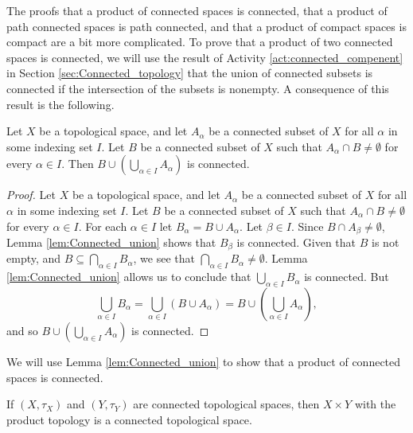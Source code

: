 The proofs that a product of connected spaces is connected, that a product of path connected spaces is path connected, and that a product of compact spaces is compact are a bit more complicated. To prove that a product of two connected spaces is connected, we will use the result of Activity \ref{act:connected_compenent} in Section \ref{sec:Connected_topology} that the union of connected subsets is connected if the intersection of the subsets is nonempty. A consequence of this result is the following.
\label{cor:Connected_union}
\begin{lemma} \label{lem:Connected_union} Let $X$ be a topological space, and let $A_{\alpha}$ be a connected subset of $X$ for all $\alpha$ in some indexing set $I$. Let $B$ be a connected subset of $X$ such that $A_{\alpha} \cap B \neq \emptyset$ for every $\alpha \in I$. Then $B \cup \left(\bigcup_{\alpha \in I} A_{\alpha} \right)$ is connected. 
\end{lemma}

\begin{proof} Let $X$ be a topological space, and let $A_{\alpha}$ be a connected subset of $X$ for all $\alpha$ in some indexing set $I$. Let $B$ be a connected subset of $X$ such that $A_{\alpha} \cap B \neq \emptyset$ for every $\alpha \in I$. For each $\alpha \in I$ let $B_{\alpha} = B \cup A_{\alpha}$. Let $\beta \in I$. Since $B \cap A_{\beta} \neq \emptyset$, Lemma \ref{lem:Connected_union} shows that $B_{\beta}$ is connected. Given that $B$ is not empty, and $B \subseteq \bigcap_{\alpha \in I} B_{\alpha}$, we see that $\bigcap_{\alpha \in I} B_{\alpha} \neq \emptyset$. Lemma \ref{lem:Connected_union} allows us to conclude that $\bigcup_{\alpha \in I} B_{\alpha}$ is connected. But 
\[\bigcup_{\alpha \in I} B_{\alpha} = \bigcup_{\alpha \in I} (B \cup A_{\alpha}) = B \cup \left(\bigcup_{\alpha \in I} A_{\alpha}\right),\]
and so $B \cup \left(\bigcup_{\alpha \in I} A_{\alpha}\right)$ is connected. 
\end{proof}

We will use Lemma \ref{lem:Connected_union} to show that a product of connected spaces is connected. 
 
\begin{theorem} \label{thm:connected_product} If $(X, \tau_X)$ and $(Y, \tau_Y)$ are connected topological spaces, then $X \times Y$ with the product topology is a connected topological space.  
\end{theorem}

